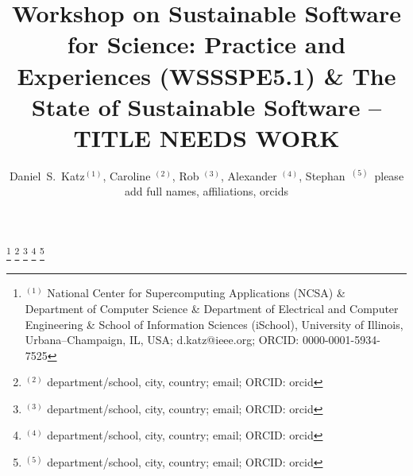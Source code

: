\documentclass[11pt, oneside]{amsart}
\begin{document}
\title[]{Workshop on Sustainable Software for Science: Practice and Experiences (WSSSPE5.1) \& The State of Sustainable Software -- TITLE NEEDS WORK}

\author{Daniel~S.~Katz$^{(1)}$,
Caroline $^{(2)}$,
Rob $^{(3)}$,
Alexander $^{(4)}$,
Stephan\ $^{(5)}$\
please add full names, affiliations, orcids
}

%
\thanks{{}$^{(1)}$ National Center for Supercomputing Applications (NCSA) \&
Department of Computer Science  \&
Department of Electrical and Computer Engineering  \&
School of Information Sciences (iSchool),
University of Illinois, Urbana--Champaign, IL, USA; d.katz@ieee.org; ORCID: 0000-0001-5934-7525}
%
\thanks{{}$^{(2)}$ department/school, city, country; email; ORCID: orcid}
%
\thanks{{}$^{(3)}$ department/school, city, country; email; ORCID: orcid}
%
\thanks{{}$^{(4)}$ department/school, city, country; email; ORCID: orcid}
%
\thanks{{}$^{(5)}$ department/school, city, country; email; ORCID: orcid}
%
\end{document}
